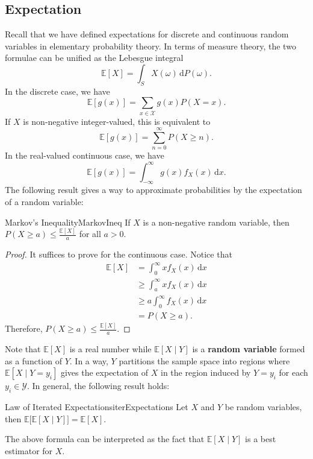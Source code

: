 \documentclass[math, code]{amznotes}
\theoremstyle{remark}
\renewcommand{\d}{\mathrm{d}}
\begin{document}
\subsection{Expectation}
Recall that we have defined expectations for discrete and continuous random variables in elementary probability theory. In terms of measure theory, the two formulae can be unified as the Lebesgue integral
\begin{equation*}
    \mathbb{E}\left[X\right] = \int_{S}\!X\left(\omega\right)\,\d P\left(\omega\right).
\end{equation*}
In the discrete case, we have 
\begin{equation*}
    \mathbb{E}\left[g\left(x\right)\right] = \sum_{x \in \mathcal{X}}g\left(x\right)P\left(X = x\right).
\end{equation*}
If $X$ is non-negative integer-valued, this is equivalent to 
\begin{equation*}
    \mathbb{E}\left[g\left(x\right)\right] = \sum_{n = 0}^{\infty}P\left(X \geq n\right).
\end{equation*}
In the real-valued continuous case, we have 
\begin{equation*}
    \mathbb{E}\left[g\left(x\right)\right] = \int_{-\infty}^{\infty}\!g\left(x\right)f_X\left(x\right)\,\d x.
\end{equation*}
The following result gives a way to approximate probabilities by the expectation of a random variable:
\begin{thmbox}{Markov's Inequality}{MarkovIneq}
    If $X$ is a non-negative random variable, then $P\left(X \geq a\right) \leq \frac{\mathbb{E}\left[X\right]}{a}$ for all $a > 0$.
    \tcblower
    \begin{proof}
        It suffices to prove for the continuous case. Notice that 
        \begin{align*}
            \mathbb{E}\left[X\right] & = \int_{0}^{\infty}\!xf_X\left(x\right)\,\d x \\
            & \geq \int_{a}^{\infty}\!xf_X\left(x\right)\,\d x \\
            & \geq a\int_{0}^{\infty}\!f_X\left(x\right)\,\d x \\
            & = P\left(X \geq a\right).
        \end{align*}
        Therefore, $P\left(X \geq a\right) \leq \frac{\mathbb{E}\left[X\right]}{a}$.
    \end{proof}
\end{thmbox}
Note that $\mathbb{E}\left[X\right]$ is a real number while $\mathbb{E}\left[X \mid Y\right]$ is a \textbf{random variable} formed as a function of $Y$. In a way, $Y$ partitions the sample space into regions where $\mathbb{E}\left[X \mid Y = y_i\right]$ gives the expectation of $X$ in the region induced by $Y = y_i$ for each $y_i \in \mathcal{Y}$. In general, the following result holds:
\begin{thmbox}{Law of Iterated Expectations}{iterExpectations}
    Let $X$ and $Y$ be random variables, then $\mathbb{E}\bigl[\mathbb{E}\left[X \mid Y\right]\bigr] = \mathbb{E}\left[X\right]$.
\end{thmbox}
The above formula can be interpreted as the fact that $\mathbb{E}\left[X \mid Y\right]$ is a best estimator for $X$.
\end{document}
